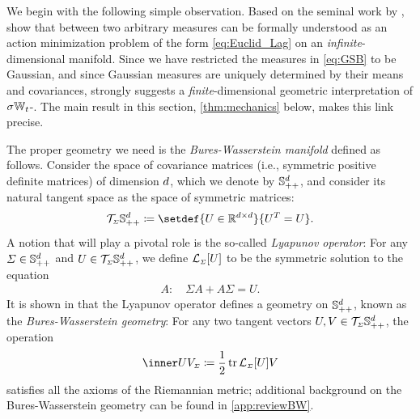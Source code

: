 \label{sec:actionBW}


 We begin with the following simple observation. Based on the seminal work by \citet{otto2001geometry}, \citet{gentil2020dynamical} show that  between two arbitrary measures can be formally understood as an action minimization problem of the form \eqref{eq:Euclid_Lag} on an \emph{infinite}-dimensional manifold. Since we have restricted the measures in \eqref{eq:GSB} to be Gaussian, and since Gaussian measures are uniquely determined by their means and covariances, \citet{gentil2020dynamical} strongly suggests a \emph{finite}-dimensional geometric interpretation of $\sigma\mathbb{W}_{t}$-. The main result in this section, \cref{thm:mechanics} below, makes this link precise.

The proper geometry we need is the \emph{Bures-Wasserstein manifold} \citep{takatsu2010wasserstein, bhatia2019bures} defined as follows. Consider the space of covariance matrices (i.e., symmetric positive definite matrices) of dimension $d$, which we denote by $\mathbb{S}_{++}^d$, and consider its natural {tangent space} as the space of symmetric matrices:
\begin{equation}
\mathcal{T}_{\ssstyle \Sigma} \SPD \defeq \setdef{U \in \R^{\vdim\times\vdim}}{ U^T  = U}.
\end{equation}
A notion that will play a pivotal role is the so-called \emph{Lyapunov operator}: For any $\Sigma \in \mathbb{S}_{++}^d$ and $U\in\mathcal{T}_{\scriptscriptstyle \Sigma}\mathbb{S}_{++}^d$, we define $\lyap[\Sigma][U]$ to be the symmetric solution to the equation
\begin{align}
\label{eq:lya}
A: \quad \Sigma A  + A \Sigma = U.
\end{align}
It is shown in \citet{takatsu2010wasserstein} that the Lyapunov operator defines a geometry on $\mathbb{S}_{++}^d$, known as the \emph{Bures-Wasserstein geometry}: For any two tangent vectors $U, V\in \mathcal{T}_{\scriptscriptstyle \Sigma}\mathbb{S}_{++}^d$, the operation
\begin{align}
\label{eq:BW-tensorMain}
\innerBW[U][V][\Sigma] \defeq %
\frac{1}{2}\tr \lyap[\Sigma][U]V%
\end{align}satisfies all the axioms of the Riemannian metric; additional background on the Bures-Wasserstein geometry can be found in \cref{app:reviewBW}. 

